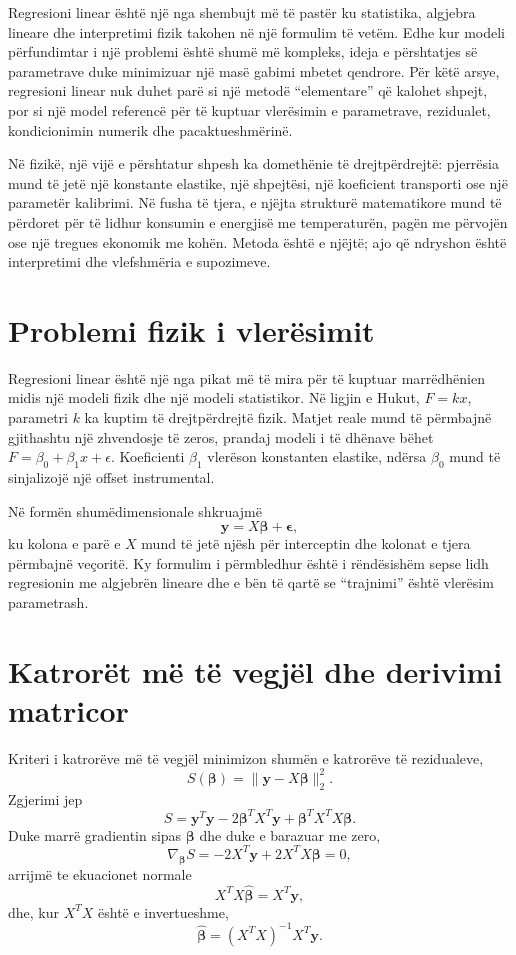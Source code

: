 \documentclass[12pt,a4paper,oneside]{book}
\begin{document}
Regresioni linear është një nga shembujt më të pastër ku statistika, algjebra lineare dhe interpretimi fizik takohen në një formulim të vetëm. Edhe kur modeli përfundimtar i një problemi është shumë më kompleks, ideja e përshtatjes së parametrave duke minimizuar një masë gabimi mbetet qendrore. Për këtë arsye, regresioni linear nuk duhet parë si një metodë ``elementare'' që kalohet shpejt, por si një model referencë për të kuptuar vlerësimin e parametrave, rezidualet, kondicionimin numerik dhe pacaktueshmërinë.

Në fizikë, një vijë e përshtatur shpesh ka domethënie të drejtpërdrejtë: pjerrësia mund të jetë një konstante elastike, një shpejtësi, një koeficient transporti ose një parametër kalibrimi. Në fusha të tjera, e njëjta strukturë matematikore mund të përdoret për të lidhur konsumin e energjisë me temperaturën, pagën me përvojën ose një tregues ekonomik me kohën. Metoda është e njëjtë; ajo që ndryshon është interpretimi dhe vlefshmëria e supozimeve.
\section{Problemi fizik i vlerësimit}

Regresioni linear është një nga pikat më të mira për të kuptuar marrëdhënien midis një modeli fizik dhe një modeli statistikor. Në ligjin e Hukut, $F=kx$, parametri $k$ ka kuptim të drejtpërdrejtë fizik. Matjet reale mund të përmbajnë gjithashtu një zhvendosje të zeros, prandaj modeli i të dhënave bëhet $F=\beta_0+\beta_1 x+\epsilon$. Koeficienti $\beta_1$ vlerëson konstanten elastike, ndërsa $\beta_0$ mund të sinjalizojë një offset instrumental.

Në formën shumëdimensionale shkruajmë
\[
\mathbf y=X\boldsymbol\beta+\boldsymbol\epsilon,
\]
ku kolona e parë e $X$ mund të jetë njësh për interceptin dhe kolonat e tjera përmbajnë veçoritë. Ky formulim i përmbledhur është i rëndësishëm sepse lidh regresionin me algjebrën lineare dhe e bën të qartë se ``trajnimi'' është vlerësim parametrash.

\section{Katrorët më të vegjël dhe derivimi matricor}

Kriteri i katrorëve më të vegjël minimizon shumën e katrorëve të rezidualeve,
\[
S(\boldsymbol\beta)=\|\mathbf y-X\boldsymbol\beta\|_2^2.
\]
Zgjerimi jep
\[
S=\mathbf y^T\mathbf y-2\boldsymbol\beta^T X^T\mathbf y+\boldsymbol\beta^T X^T X\boldsymbol\beta.
\]
Duke marrë gradientin sipas $\boldsymbol\beta$ dhe duke e barazuar me zero,
\[
\nabla_{\boldsymbol\beta}S=-2X^T\mathbf y+2X^TX\boldsymbol\beta=0,
\]
arrijmë te ekuacionet normale
\[
X^TX\hat{\boldsymbol\beta}=X^T\mathbf y,
\]
dhe, kur $X^TX$ është e invertueshme,
\[
\hat{\boldsymbol\beta}=(X^TX)^{-1}X^T\mathbf y.
\]
\end{document}
